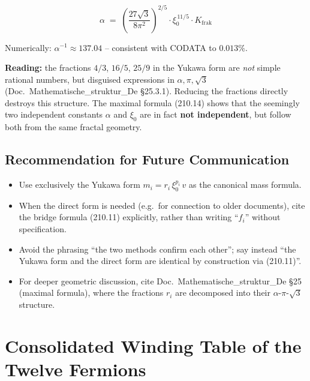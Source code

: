 \begin{equation}
  \boxed{\;\alpha \;=\; \left(\frac{27\sqrt{3}}{8\pi^2}\right)^{2/5}
  \cdot \xi_0^{\,11/5} \cdot K_{\text{frak}}\;}
  \tag{210.14}
\end{equation}

Numerically: $\alpha^{-1} \approx 137.04$ -- consistent with CODATA
to $0.013\%$.

\textbf{Reading:} the fractions $4/3$, $16/5$, $25/9$ in the
Yukawa form are \emph{not} simple rational numbers, but disguised
expressions in $\alpha, \pi, \sqrt{3}$
(Doc.~Mathematische\_struktur\_De §25.3.1). Reducing the fractions
directly destroys this structure. The maximal formula (210.14)
shows that the seemingly two independent constants $\alpha$ and
$\xi_0$ are in fact \textbf{not independent}, but follow both from
the same fractal geometry.

\subsection*{Recommendation for Future Communication}

\begin{itemize}
  \item Use exclusively the Yukawa form $m_i = r_i\,\xi_0^{p_i}\,v$
        as the canonical mass formula.
  \item When the direct form is needed (e.g.\ for connection to older
        documents), cite the bridge formula (210.11) explicitly,
        rather than writing \enquote{$f_i$} without specification.
  \item Avoid the phrasing \enquote{the two methods confirm each
        other}; say instead \enquote{the Yukawa form and the direct
        form are identical by construction via (210.11)}.
  \item For deeper geometric discussion, cite
        Doc.~Mathematische\_struktur\_De §25 (maximal formula), where
        the fractions $r_i$ are decomposed into their
        $\alpha$-$\pi$-$\sqrt{3}$ structure.
\end{itemize}

\section{\texorpdfstring{Consolidated Winding Table of the Twelve Fermions}{Consolidated Winding Table of the Twelve Fermions}}

